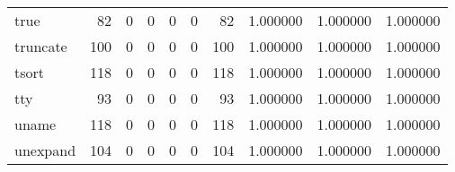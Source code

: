 \begin{longtable}{lrrrrrrrrr}
true      &                                                 82 &                                                  0 &                                                  0 &                                                  0 &                                                  0 &                                                 82 &                                           1.000000 &                               1.000000 &                             1.000000 \\
truncate  &                                                100 &                                                  0 &                                                  0 &                                                  0 &                                                  0 &                                                100 &                                           1.000000 &                               1.000000 &                             1.000000 \\
tsort     &                                                118 &                                                  0 &                                                  0 &                                                  0 &                                                  0 &                                                118 &                                           1.000000 &                               1.000000 &                             1.000000 \\
tty       &                                                 93 &                                                  0 &                                                  0 &                                                  0 &                                                  0 &                                                 93 &                                           1.000000 &                               1.000000 &                             1.000000 \\
uname     &                                                118 &                                                  0 &                                                  0 &                                                  0 &                                                  0 &                                                118 &                                           1.000000 &                               1.000000 &                             1.000000 \\
unexpand  &                                                104 &                                                  0 &                                                  0 &                                                  0 &                                                  0 &                                                104 &                                           1.000000 &                               1.000000 &                             1.000000 \\

\end{longtable}
